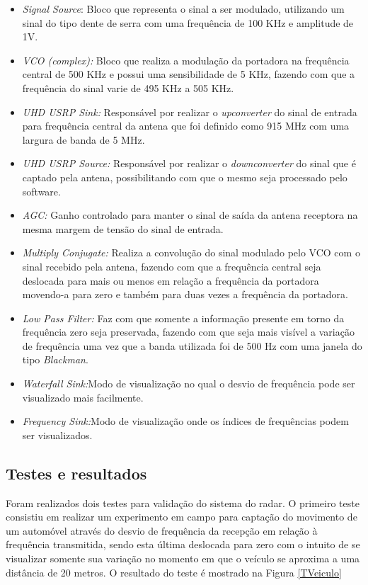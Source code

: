\begin{itemize}
    \item \emph{Signal Source}: Bloco que representa o sinal a ser modulado, utilizando um sinal do tipo dente de serra com uma frequência de 100 KHz e amplitude de 1V.
    \item \emph{VCO (complex):} Bloco que realiza a modulação da portadora na frequência central de 500 KHz e possui uma sensibilidade de 5 KHz, fazendo com que a frequência do sinal varie de 495 KHz a 505 KHz.
    \item \emph{UHD USRP Sink:}  Responsável por realizar o \emph{upconverter} do sinal de entrada para frequência central da antena que foi definido como 915 MHz com uma largura de banda de 5 MHz.
    \item \emph{UHD USRP Source:} Responsável por realizar o \emph{downconverter} do sinal que é captado pela antena, possibilitando com que o mesmo seja processado pelo software.
    \item \emph{AGC:} Ganho controlado para manter o sinal de saída da antena receptora na mesma margem de tensão do sinal de entrada.
    \item \emph{Multiply Conjugate:} Realiza a convolução do sinal modulado pelo VCO com o sinal recebido pela antena, fazendo com que a frequência central seja deslocada para mais ou menos em relação a frequência da portadora movendo-a para zero e também para duas vezes a frequência da portadora.
    \item\emph{Low Pass Filter:} Faz com que somente a informação presente em torno da frequência zero seja preservada, fazendo com que seja mais visível a variação de frequência uma vez que a banda utilizada foi de 500 Hz com uma janela do tipo \emph{Blackman}.
    \item \emph{Waterfall Sink:}Modo de visualização no qual o desvio de frequência pode ser visualizado mais facilmente.
    \item \emph{Frequency Sink:}Modo de visualização onde os índices de frequências podem ser visualizados.
\end{itemize} 

\subsection{Testes e resultados}

    Foram realizados dois testes para validação do sistema do radar. O primeiro teste consistiu em realizar um experimento em campo para captação do movimento de um automóvel através do desvio de frequência da recepção em relação à frequência transmitida, sendo esta última deslocada para zero com o intuito de se visualizar somente sua variação no momento em que o veículo se aproxima a uma distância de 20 metros. O resultado do teste é mostrado na Figura \ref{TVeiculo}

